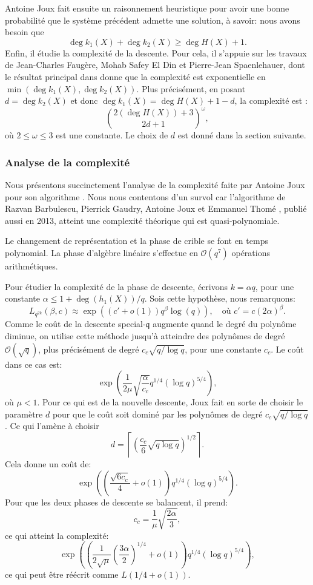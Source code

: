 \documentclass[a4paper, titlepage, 11pt]{article}
\theoremstyle{definition}
\theoremstyle{remark}
\def\O{\mathcal O}
\def\o{o}
\def\ceil #1{\left\lceil#1\right\rceil}
\begin{document}
Antoine Joux \cite{joux2013} fait ensuite un raisonnement heuristique pour avoir une bonne probabilité que le système précédent admette une solution, à savoir: nous avons besoin que 
$$\deg k_1(X) + \deg k_2(X) \geqslant \deg H(X) + 1.$$
Enfin, il étudie la complexité de la descente. Pour cela, il s'appuie sur les travaux de Jean-Charles Faugère, Mohab Safey El Din et Pierre-Jean Spaenlehauer, dont le résultat principal dans \cite{faugere2011, spaenlehauer2012} donne que la complexité est exponentielle en $\min(\deg k_1(X), \deg k_2 (X))$.
Plus précisément, en posant $d = \deg k_2(X)$ et donc $\deg k_1(X) = \deg H(X) +1 - d$, la complexité est :
$$\binom{2 (\deg H(X)) + 3}{2d+1}^\omega,$$
où $2 \leqslant \omega \leqslant 3$ est une constante. 
Le choix de $d$ est donné dans la section suivante.

\subsubsection{Analyse de la complexité}

Nous présentons succinctement l'analyse de la complexité faite par Antoine Joux pour son algorithme \cite{joux2013}. Nous nous contentons d'un survol car l'algorithme de Razvan Barbulescu, Pierrick Gaudry, Antoine Joux et Emmanuel Thomé \cite{barbulescu2013}, publié aussi en 2013, atteint une complexité théorique qui est quasi-polynomiale.

Le changement de représentation et la phase de crible se font en temps polynomial. La phase d'algèbre linéaire s'effectue en $\O(q^7)$ opérations arithmétiques.

Pour étudier la complexité de la phase de descente, écrivons $k = \alpha q$, pour une constante $\alpha \leqslant 1 + \deg(h_1(X)) / q$. Sois cette hypothèse, nous remarquons:
$$L_{q^{2k}}(\beta, c) \approx \exp\left((c'+\o(1))q^\beta\log(q)\right),\quad\text{où } c' = c(2\alpha)^\beta.$$
Comme le coût de la descente special-$\mathfrak{q}$ augmente quand le degré du polynôme diminue, on utilise cette méthode jusqu'à atteindre des polynômes de degré $\O(\sqrt{q})$, plus précisément de degré $c_c\sqrt{q/\log q}$, pour une constante $c_c$. Le coût dans ce cas est:
$$\exp\left(\frac{1}{2\mu}\sqrt{\frac{\alpha}{c_c}}q^{1/4}(\log q)^{5/4}\right),$$
où $\mu < 1$. Pour ce qui est de la nouvelle descente, Joux fait en sorte de choisir le paramètre $d$ pour que le coût soit dominé par les polynômes de degré $c_c\sqrt{q/\log q}$. Ce qui l'amène à choisir 
$$d = \ceil{\left(\frac{c_c}{6}\sqrt{q\log q}\right)^{1/2}}.$$
Cela donne un coût de:
$$\exp\left(\left( \frac{\sqrt{6c_c}}{4} + \o(1)\right)q^{1/4}(\log q)^{5/4}\right).$$
Pour que les deux phases de descente se balancent, il prend:
$$c_c = \frac{1}{\mu}\sqrt{\frac{2\alpha}{3}},$$
ce qui atteint la complexité:
$$\exp\left(\left(\frac{1}{2\sqrt{\mu}}{\left(\frac{3\alpha}{2}\right)}^{1/4}+\o(1)\right)q^{1/4}(\log q)^{5/4}\right),$$
ce qui peut être réécrit comme $L(1/4+\o(1))$.
\end{document}
